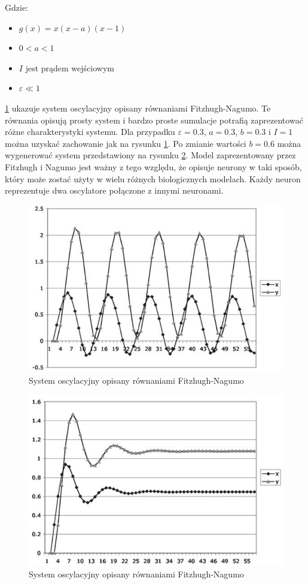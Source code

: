 Gdzie:
\begin{itemize}
\item $g(x) = x (x-a) (x-1)$
\item $0<a<1$ 
\item $I$ jest prądem wejściowym 
\item $\varepsilon\ll1$
\end{itemize}
\ref{fig:FitzhughNagumoequation} ukazuje system oscylacyjny opisany równaniami Fitzhugh-Nagumo.
Te równania opisują prosty system i bardzo proste sumulacje potrafią zaprezentować różne charakterystyki systemu.
Dla przypadku $\varepsilon=0.3$, $a=0.3$, $b=0.3$ i $I=1$ można uzyskać zachowanie jak na rysunku \ref{fig:FitzhughNagumoequation}.
Po zmianie wartości $b=0.6$ można wygenerować system przedstawiony na rysunku \ref{fig:FitzhughNagumoequation2}.
Model zaprezentowany przez Fitzhugh i Nagumo jest ważny z tego względu,
że opisuje neurony w taki sposób, który może zostać użyty w wielu różnych biologicznych modelach.
Każdy neuron reprezentuje dwa oscylatore połączone z innymi neuronami.
\begin{figure}[ht]
	\centering
	\includegraphics[width=\textwidth*4/5]{FitzhughNagumoequation.png}
	\caption{System oscylacyjny opisany równaniami Fitzhugh-Nagumo} \label{fig:FitzhughNagumoequation}
\end{figure}
\begin{figure}[ht]
	\centering
	\includegraphics[width=\textwidth*4/5]{FitzhughNagumoequation2.png}
	\caption{System oscylacyjny opisany równaniami Fitzhugh-Nagumo} \label{fig:FitzhughNagumoequation2}
\end{figure}
